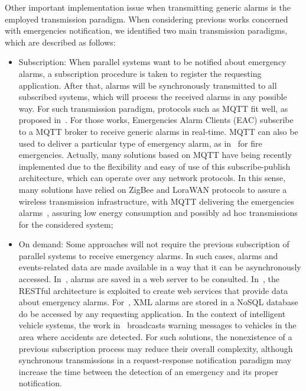 \begin{refsection}
Other important implementation issue when transmitting generic alarms is the employed transmission paradigm. When considering previous works concerned with emergencies notification, we identified two main transmission paradigms, which are described as follows:

\begin{itemize}
  \item Subscription: When parallel systems want to be notified about emergency alarms, a subscription procedure is taken to register the requesting application. After that, alarms will be synchronously transmitted to all subscribed systems, which will process the received alarms in any possible way. For such transmission paradigm, protocols such as MQTT fit well, as proposed in~\cite{emergenciesmetric2,emergenciesmetric3}. For those works, Emergencies Alarm Clients (EAC) subscribe to a MQTT broker to receive generic alarms in real-time. MQTT can also be used to deliver a particular type of emergency alarm, as in~\cite{iotFire3,iotmqtt} for fire emergencies. Actually, many solutions based on MQTT have being recently implemented due to the flexibility and easy of use of this subscribe-publish architecture, which can operate over any network protocols. In this sense, many solutions have relied on ZigBee and LoraWAN protocols to assure a wireless transmission infrastructure, with MQTT delivering the emergencies alarms~\cite{iotFire3,lora2,iotmqtt2}, assuring low energy consumption and possibly ad hoc transmissions for the considered system;
  
  \item On demand: Some approaches will not require the previous subscription of parallel systems to receive emergency alarms. In such cases, alarms and events-related data are made available in a way that it can be asynchronously accessed. In~\cite{emergenciesmetric5}, alarms are saved in a web server to be consulted. In~\cite{iotgadget1}, the RESTful architecture is exploited to create web services that provide data about emergency alarms. For~\cite{emergenciesxml2}, XML alarms are stored in a NoSQL database do be accessed by any requesting application. In the context of intelligent vehicle systems, the work in~\cite{citiesvehicles3} broadcasts warning messages to vehicles in the area where accidents are detected. For such solutions, the nonexistence of a previous subscription process may reduce their overall complexity, although synchronous transmissions in a request-response notification paradigm may increase the time between the detection of an emergency and its proper notification.
\end{itemize}


\end{refsection}

